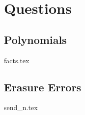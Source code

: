 \documentclass{exam}
\begin{document}
\section{Questions}
\subsection{Polynomials}
\begin{enumerate}
{facts.tex}
\end{enumerate}

\subsection{Erasure Errors}
\begin{enumerate}
{send_n.tex}
\end{enumerate}
\end{document}
